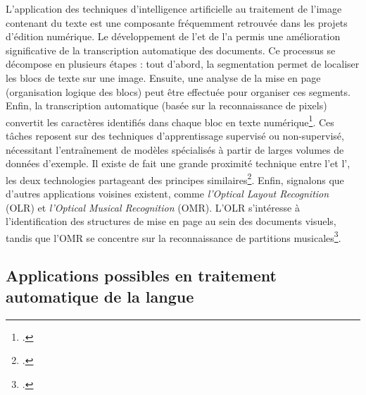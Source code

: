 L’application des techniques d’intelligence artificielle au traitement de l’image contenant du texte est une composante fréquemment retrouvée dans les projets d’édition numérique. Le développement de l'\ocr et de l'\htr a permis une amélioration significative de la transcription automatique des documents. Ce processus se décompose en plusieurs étapes : tout d’abord, la segmentation permet de localiser les blocs de texte sur une image. Ensuite, une analyse de la mise en page (organisation logique des blocs) peut être effectuée pour organiser ces segments. Enfin, la transcription automatique (basée sur la reconnaissance de pixels) convertit les caractères identifiés dans chaque bloc en texte numérique\footcite[p.3]{chague_htr-united_2022}. Ces tâches reposent sur des techniques d'apprentissage supervisé ou non-supervisé, nécessitant l'entraînement de modèles spécialisés à partir de larges volumes de données d'exemple. Il existe de fait une grande proximité technique entre l’\htr et l’\ocr, les deux technologies partageant des principes similaires\footcite[p.5]{biay_chaine_2022}. Enfin, signalons que d’autres applications voisines existent,  comme \textit{l’Optical Layout Recognition} (OLR) et \textit{l’Optical Musical Recognition} (OMR). L'OLR s’intéresse à l’identification des structures de mise en page au sein des documents visuels, tandis que l’OMR se concentre sur la reconnaissance de partitions musicales\footcite[p.91]{bermes_patrimoine_2020}.

\subsection{Applications possibles en traitement automatique de la langue}

